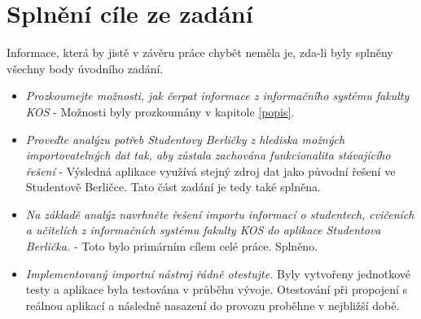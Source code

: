 \documentclass[11pt,twoside,a4paper]{book}
\begin{document}
\section{Splnění cíle ze zadání}
Informace, která by jistě v závěru práce chybět neměla je, zda-li byly splněny všechny body úvodního zadání.
\begin{itemize}
\item \textit{Prozkoumejte možnosti, jak čerpat informace z informačního systému fakulty KOS} - Možnosti byly prozkoumány v kapitole \ref{popis}.
\item \textit{Proveďte analýzu potřeb Studentovy Berličky z hlediska možných importovatelných dat tak, aby zůstala zachována funkcionalita stávajícího řešení} - Výsledná aplikace využívá stejný zdroj dat jako původní řešení ve Studentově Berličce. Tato část zadání je tedy také splněna.
\item \textit{Na základě analýz navrhněte řešení importu informací o studentech, cvičeních a učitelích z informačních systému fakulty KOS do aplikace Studentova Berlička.} - Toto bylo primárním cílem celé práce. Splněno.
\item \textit{Implementovaný importní nástroj řádně otestujte.} Byly vytvořeny jednotkové testy a aplikace byla testována v průběhu vývoje. Otestování při propojení s reálnou aplikací a následně nasazení do provozu proběhne v nejbližší době.
\end{itemize}


%




%
{

}
\end{document}

